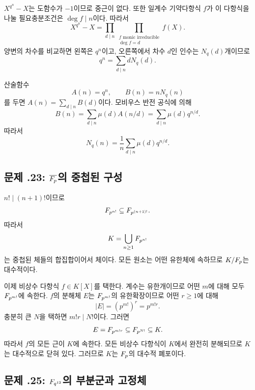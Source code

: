 \begin{solution}
$X^{q^n}-X$는 도함수가 $-1$이므로 중근이 없다. 또한 일계수 기약다항식 $f$가 이 다항식을 나눌 필요충분조건은 $\deg f\mid n$이다. 따라서
\[
  X^{q^n}-X
  =\prod_{d\mid n}\prod_{\substack{f\text{ monic irreducible}\\\deg f=d}}f(X).
\]
양변의 차수를 비교하면 왼쪽은 $q^n$이고, 오른쪽에서 차수 $d$인 인수는 $N_q(d)$개이므로
\[
  q^n=\sum_{d\mid n}dN_q(d).
\]

산술함수
\[
  A(n)=q^n,
  \qquad
  B(n)=nN_q(n)
\]
를 두면 $A(n)=\sum_{d\mid n}B(d)$이다. 모비우스 반전 공식에 의해
\[
  B(n)=\sum_{d\mid n}\mu(d)A(n/d)
  =\sum_{d\mid n}\mu(d)q^{n/d}.
\]
따라서
\[
  N_q(n)=\frac1n\sum_{d\mid n}\mu(d)q^{n/d}.
\]
\end{solution}

\subsection*{문제 \thechapter.23: $\overline{F_p}$의 중첩된 구성}

\begin{solution}
$n!\mid(n+1)!$이므로
\[
  F_{p^{n!}}\subseteq F_{p^{(n+1)!}}.
\]
따라서
\[
  K=\bigcup_{n\ge1}F_{p^{n!}}
\]
는 중첩된 체들의 합집합이어서 체이다. 모든 원소는 어떤 유한체에 속하므로 $K/F_p$는 대수적이다.

이제 비상수 다항식 $f\in K[X]$를 택한다. 계수는 유한개이므로 어떤 $m$에 대해 모두 $F_{p^{m!}}$에 속한다. $f$의 분해체 $E$는 $F_{p^{m!}}$의 유한확장이므로 어떤 $r\ge1$에 대해
\[
  |E|=(p^{m!})^r=p^{m!r}.
\]
충분히 큰 $N$을 택하면 $m!r\mid N!$이다. 그러면
\[
  E=F_{p^{m!r}}\subseteq F_{p^{N!}}\subseteq K.
\]
따라서 $f$의 모든 근이 $K$에 속한다. 모든 비상수 다항식이 $K$에서 완전히 분해되므로 $K$는 대수적으로 닫혀 있다. 그러므로 $K$는 $F_p$의 대수적 폐포이다.
\end{solution}

\subsection*{문제 \thechapter.25: $F_{q^{12}}$의 부분군과 고정체}

